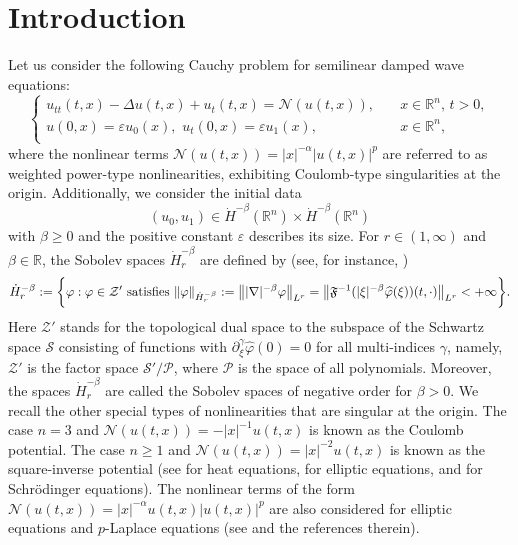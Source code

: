 \documentclass[11pt,reqno]{amsart}
\newcommand{\R}{\mathbb{R}}
\begin{document}
\section{Introduction}
Let us consider the following Cauchy problem for semilinear damped wave equations:
\begin{equation} \label{Main.Eq.1}
\begin{cases}
u_{tt}(t,x) -\Delta u (t,x) + u_t(t,x)= \mathcal{N}(u(t,x)), &\quad x\in \R^n,\, t > 0, \\
u(0,x)= \varepsilon u_0(x), \,\, u_t(0,x) = \varepsilon u_1(x), &\quad x \in \mathbb{R}^n, \\
\end{cases}
\end{equation}
where the nonlinear terms $\mathcal{N}(u(t,x)) = |x|^{-\alpha}|u(t,x)|^p$ are referred to as weighted power-type nonlinearities, exhibiting Coulomb-type singularities at the origin.
Additionally, we consider the initial data $$(u_0, u_1) \in \dot{H}^{-\beta}(\mathbb{R}^n) \times \dot{H}^{-\beta}(\mathbb{R}^n)$$ with $\beta \geq 0$ and the positive constant $\varepsilon$
describes its size. For $r \in (1, \infty)$ and $\beta \in \mathbb{R}$, the Sobolev spaces $\dot{H}_r^{-\beta}$ are defined by (see, for instance, \cite[section 1.3.3]{Garafakos2014}) 
\begin{align*}
    \dot{H}_r^{-\beta} := \bigg\{\varphi: \varphi \in \mathcal{Z}' \text{ satisfies } \|\varphi\|_{\dot{H}_r^{-\beta}} := \big\||\nabla|^{-\beta} \varphi\big\|_{L^r} = \big\|\frak{F}^{-1}(|\xi|^{-\beta} \widehat{\varphi}(\xi))(t,\cdot)\big\|_{L^r} < +\infty\bigg\}.
\end{align*}
Here $\mathcal{Z}'$ stands for the topological dual space to the subspace of the Schwartz space $\mathcal{S}$ consisting of functions with $\partial_{\xi}^{\gamma} \hat{\varphi}(0) = 0$ for all multi-indices $\gamma$, namely, $\mathcal{Z}'$  is the
factor space $\mathcal{S}'/\mathcal{P}$, where $\mathcal{P}$ is the space of all polynomials. Moreover, the spaces $\dot{H}_r^{-\beta}$ are called the Sobolev spaces of negative order for $\beta > 0$. We recall the other special types of nonlinearities that are singular at the origin. The case $n=3$ and $\mathcal{N}(u(t,x))= -|x|^{-1} u(t,x) $  is known as the Coulomb potential. The case $n\geq 1$ and $\mathcal{N}(u(t,x)) = |x|^{-2} u(t,x)$ is known as the square-inverse potential (see \cite{Baras1984} for heat equations, \cite{Brezis2005} for elliptic equations, and \cite{Burq2003} for Schr\"odinger equations). The nonlinear terms of the form $\mathcal{N}(u(t,x)) = |x|^{-\alpha} u(t,x)|u(t,x)|^p$ are
also considered for elliptic equations and $p$-Laplace equations (see \cite{Garcia1998} and the
references therein). 
\end{document}
